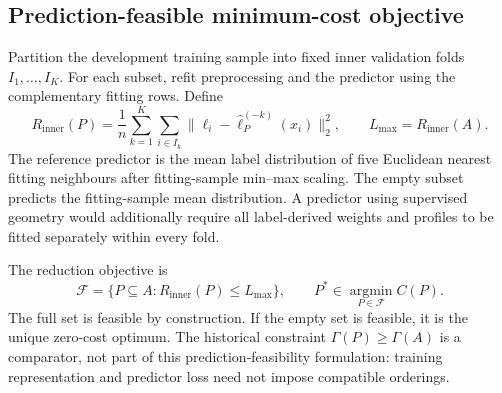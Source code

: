 \subsection{Prediction-feasible minimum-cost objective}
Partition the development training sample into fixed inner validation folds $I_1,\ldots,I_K$. For each subset, refit preprocessing and the predictor using the complementary fitting rows. Define
\begin{equation}
 R_{\mathrm{inner}}(P)=\frac{1}{n}\sum_{k=1}^K\sum_{i\in I_k}
 \|\boldsymbol\ell_i-\widehat{\boldsymbol\ell}^{(-k)}_P(x_i)\|_2^2,
 \qquad L_{\max}=R_{\mathrm{inner}}(A).
\end{equation}
The reference predictor is the mean label distribution of five Euclidean nearest fitting neighbours after fitting-sample min--max scaling. The empty subset predicts the fitting-sample mean distribution. A predictor using supervised geometry would additionally require all label-derived weights and profiles to be fitted separately within every fold.

The reduction objective is
\begin{equation}
 \mathcal F=\{P\subseteq A:R_{\mathrm{inner}}(P)\le L_{\max}\},
 \qquad P^*\in\operatorname*{argmin}_{P\in\mathcal F}C(P).
 \label{eq:formal-cost-objective}
\end{equation}
The full set is feasible by construction. If the empty set is feasible, it is the unique zero-cost optimum. The historical constraint $\Gamma(P)\ge\Gamma(A)$ is a comparator, not part of this prediction-feasibility formulation: training representation and predictor loss need not impose compatible orderings.

